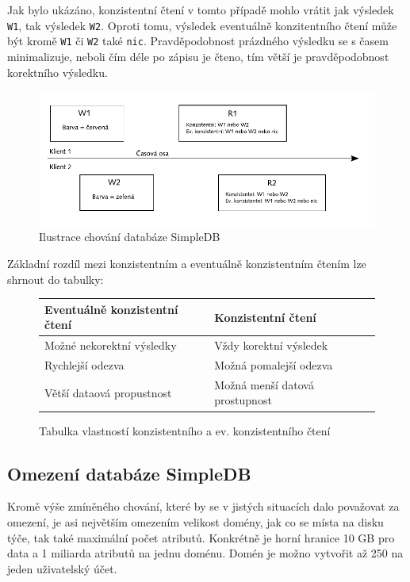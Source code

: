 \documentclass[oneside,11pt]{fithesis2}
\begin{document}
Jak bylo ukázáno, konzistentní čtení v tomto případě mohlo vrátit jak výsledek \verb<W1<, tak výsledek \verb<W2<. Oproti tomu, výsledek eventuálně konzitentního čtení může být kromě \verb<W1< či \verb<W2< také \verb<nic<. Pravděpodobnost prázdného výsledku se s časem minimalizuje, neboli čím déle po zápisu je čteno, tím větší je pravděpodobnost korektního výsledku.
\begin{figure}[h]
 \caption{Ilustrace chování databáze SimpleDB}
 \centering
 \includegraphics[scale=0.9]{ConsistencyExample}
\end{figure}

Základní rozdíl mezi konzistentním a eventuálně konzistentním čtením lze shrnout do tabulky:
\begin{figure}[h]
 \caption{Tabulka vlastností konzistentního a ev. konzistentního čtení}
 \vspace{5mm}
 \begin{tabular}{l|l}
    Eventuálně konzistentní čtení & Konzistentní čtení\\ \hline
    Možné nekorektní výsledky & Vždy korektní výsledek\\ 
    Rychlejší odezva & Možná pomalejší odezva \\
    Větší dataová propustnost & Možná menší datová prostupnost
 \end{tabular}
\end{figure}

\subsection*{Omezení databáze SimpleDB}
Kromě výše zmíněného chování, které by se v jistých situacích dalo považovat za omezení, je asi největším omezením velikost domény, jak co se místa na disku týče, tak také maximální počet atributů. Konkrétně je horní hranice 10 GB pro data a 1 miliarda atributů na jednu doménu. Domén je možno vytvořit až 250 na jeden uživatelský účet.
\end{document}
